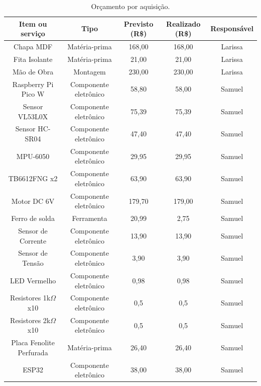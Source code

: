 \begin{table}[htpb]
\centering
\footnotesize
\caption{Orçamento por aquisição.}
\begin{tabular}{|c|c|c|c|c|}
\hline
\textbf{Item ou serviço} & \textbf{Tipo} & \textbf{Previsto (R\$)} & \textbf{Realizado (R\$)} & \textbf{Responsável} \\ \hline
Chapa MDF      & Matéria-prima & 168,00   & 168,00 & Larissa                   \\ \hline
Fita Isolante        & Matéria-prima & 21,00   & 21,00 & Larissa                    \\ \hline
Mão de Obra & Montagem & 230,00   & 230,00 & Larissa                    \\ \hline
Raspberry Pi Pico W      & Componente eletrônico & 58,80  & 58,00 & Samuel                     \\ \hline
Sensor VL53L0X     & Componente eletrônico & 75,39   & 75,39 & Samuel                     \\ \hline
Sensor HC-SR04 & Componente eletrônico & 47,40   & 47,40 & Samuel                     \\ \hline
MPU-6050 & Componente eletrônico & 29,95   & 29,95 & Samuel                   \\ \hline
TB6612FNG x2 & Componente eletrônico & 63,90  & 63,90 & Samuel                     \\ \hline
Motor DC 6V & Componente eletrônico & 179,70   & 179,00 & Samuel                     \\ \hline
Ferro de solda & Ferramenta & 20,99   & 2,75 & Samuel                     \\ \hline
Sensor de Corrente & Componente eletrônico & 13,90   & 13,90 & Samuel                     \\ \hline
Sensor de Tensão & Componente eletrônico & 3,90   & 3,90 & Samuel                     \\ \hline
LED Vermelho & Componente eletrônico & 0,98   & 0,98 & Samuel                     \\ \hline
Resistores 1k$\Omega$ x10 & Componente eletrônico & 0,5   & 0,5 & Samuel                     \\ \hline
Resistores 2k$\Omega$ x10 & Componente eletrônico & 0,5   & 0,5 & Samuel                     \\ \hline
Placa Fenolite Perfurada & Matéria-prima & 26,40   & 26,40 & Samuel                     \\ \hline
ESP32 & Componente eletrônico & 38,00   & 38,00 & Samuel                     \\ \hline

\end{tabular}
\end{table}
